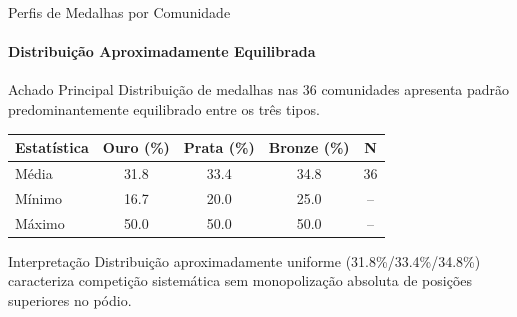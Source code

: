 \begin{frame}{Perfis de Medalhas por Comunidade}
    \framesubtitle{Distribuição Aproximadamente Equilibrada}
    \begin{block}{Achado Principal}
        Distribuição de medalhas nas 36 comunidades apresenta padrão predominantemente equilibrado entre os três tipos.
    \end{block}

    \begin{table}[h]
        \centering
        \footnotesize
        \begin{tabular}{lcccc}
            \toprule
            \textbf{Estatística} & \textbf{Ouro (\%)} & \textbf{Prata (\%)} & \textbf{Bronze (\%)} & \textbf{N} \\
            \midrule
            Média         & 31.8      & 33.4       & 34.8        & 36 \\
            Mínimo        & 16.7      & 20.0       & 25.0        & -- \\
            Máximo        & 50.0      & 50.0       & 50.0        & -- \\
            \bottomrule
        \end{tabular}
    \end{table}

    \vspace{0.3cm}
    \begin{block}{Interpretação}
        \footnotesize
        Distribuição aproximadamente uniforme (31.8\%/33.4\%/34.8\%) caracteriza competição sistemática sem monopolização absoluta de posições superiores no pódio.
    \end{block}
\end{frame}

